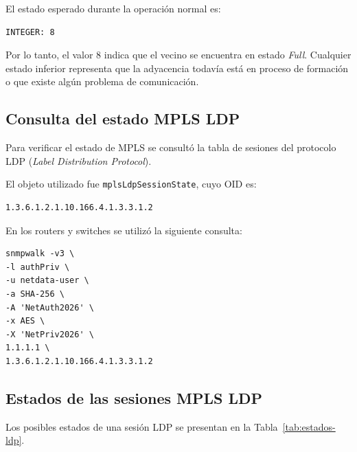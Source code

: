 El estado esperado durante la operación normal es:

\begin{lstlisting}[style=terminal]
INTEGER: 8
\end{lstlisting}

Por lo tanto, el valor 8 indica que el vecino se encuentra en estado \textit{Full}. Cualquier estado inferior representa que la adyacencia todavía está en proceso de formación o que existe algún problema de comunicación.

\subsection{Consulta del estado MPLS LDP}

Para verificar el estado de MPLS se consultó la tabla de sesiones del protocolo LDP (\textit{Label Distribution Protocol}).

El objeto utilizado fue \texttt{mplsLdpSessionState}, cuyo OID es:

\begin{lstlisting}[style=terminal]
1.3.6.1.2.1.10.166.4.1.3.3.1.2
\end{lstlisting}

En los routers y switches se utilizó la siguiente consulta:

\begin{lstlisting}[style=terminal]
snmpwalk -v3 \
-l authPriv \
-u netdata-user \
-a SHA-256 \
-A 'NetAuth2026' \
-x AES \
-X 'NetPriv2026' \
1.1.1.1 \
1.3.6.1.2.1.10.166.4.1.3.3.1.2
\end{lstlisting}



\subsection{Estados de las sesiones MPLS LDP}

Los posibles estados de una sesión LDP se presentan en la Tabla~\ref{tab:estados-ldp}.

